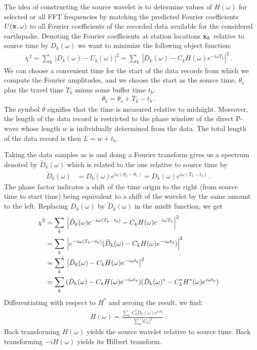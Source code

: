 The idea of constructing the source wavelet is to determine values of $H(\omega)$ for selected or all FFT frequencies by matching the predicted Fourier coefficients $U(\textbf x,\omega)$ to all Fourier coefficients of the recorded data available for the considered earthquake. Denoting the Fourier coefficients at station locations $\textbf x_k$ relative to source time by $D_k(\omega)$ we want to minimize the following object function:
%
\begin{align}
   \chi^2 = \sum_k\,\left|D_k(\omega)-U_k(\omega)\right|^2 = \sum_k\,\left|D_k(\omega)-C_{k}H(\omega)e^{-i\omega T_k}\right|^2 \,.
\end{align}
%
We can choose a convenient time for the start of the data records from which we compute the Fourier amplitudes, and we choose the start as the source time, $\theta_s$ plus the travel time $T_k$ minus some buffer time $t_b$:
%
\begin{align}
   \theta_k = \theta_s+T_k-t_b \,.
\end{align}
%
The symbol $\theta$ signifies that the time is measured relative to midnight. Moreover, the length of the data record is restricted to the phase window of the direct P-wave whose length $w$ is individually determined from the data. The total length of the data record is then $L=w+t_b$.

Taking the data samples as is and doing a Fourier transform gives us a spectrum denoted by $\tilde{D}_k(\omega)$ which is related to the one relative to source time by
%
\begin{align}
   \tilde{D}_k(\omega) & = D_k(\omega) e^{i\omega(\theta_k-\theta_s)} = D_k(\omega) e^{i\omega(T_k-t_b)} \,.
\end{align}
%
The phase factor indicates a shift of the time origin to the right (from source time to start time) being equivalent to a shift of the wavelet by the same amount to the left. Replacing $D_k(\omega)$ by $\tilde{D}_k(\omega)$ in the misfit function, we get
%
\begin{align}
   \chi^2 & = \sum_k\,\left|\tilde{D}_k(\omega)e^{-i\omega(T_k-t_b)}-C_{k}H(\omega)e^{-i\omega T_k}\right|^2 \notag \\
          & = \sum_k\,\left|e^{-i\omega (T_k-t_b)}(\tilde{D}_k(\omega)-C_{k}H(\omega)e^{-i\omega t_b})\right|^2 \notag \\
          & = \sum_k\,\left|\tilde{D}_k(\omega)-C_{k}H(\omega)e^{-i\omega t_b}\right|^2 \notag \\
          & = \sum_k\,(\tilde{D}_k(\omega)-C_{k}H(\omega)e^{-i\omega t_b})(\tilde{D}_k(\omega)^*-C_{k}^*H^*(\omega)e^{i\omega t_b})
\end{align}
%
Differentiating with respect to $H^*$ and zeroing the result, we find:
%
\begin{align}
   H(\omega) = \frac{\sum_k\,C_k^* \tilde{D}_k(\omega)e^{i\omega t_b}}{\sum_k |C_k|^2} \,.
\end{align}
%
Back transforming $H(\omega)$ yields the source wavelet relative to source time. Back transforming $-iH(\omega)$ yields its Hilbert transform.


